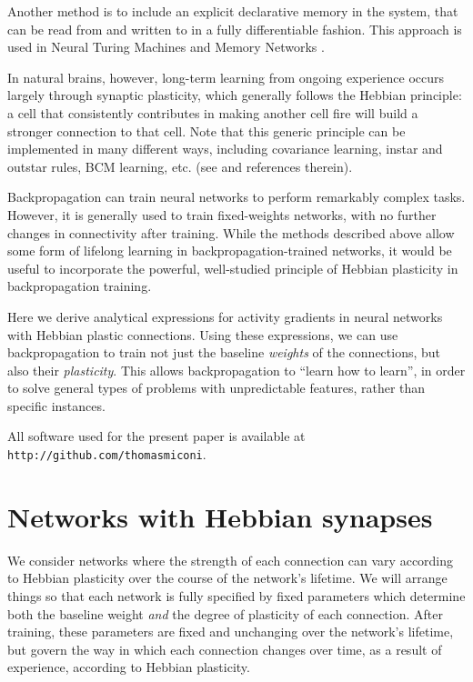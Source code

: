 \documentclass{article}
\begin{document}
Another method is to include an explicit declarative memory in the system, that can be read from and written to in a fully differentiable fashion. This 
approach is used in Neural Turing Machines
\cite{Graves2014-ch,Santoro2016-jn} and
Memory Networks \cite{Sukhbaatar2015-ly}. 


In natural brains, however, long-term learning from ongoing experience occurs
largely through synaptic plasticity, which generally follows the Hebbian principle: a
cell that consistently contributes in making another cell fire will build a
stronger connection to that cell. Note that this generic principle can be
implemented in many different ways, including covariance learning, instar and
outstar rules, BCM learning, etc. (see \cite{Vasilkoski2011-ww} and references therein). 

Backpropagation can train neural networks to perform remarkably complex
tasks. However, it is generally used to train fixed-weights networks, with no further changes in connectivity after training. While the methods described above allow some form of lifelong learning in backpropagation-trained networks, 
it would be useful to incorporate the powerful, well-studied
principle of Hebbian plasticity in backpropagation
training.

Here we derive analytical expressions for activity gradients in neural networks
with Hebbian plastic connections. Using these expressions, we can use
backpropagation to train not just the baseline \emph{weights} of the connections, but
also their \emph{plasticity}. This allows backpropagation to ``learn how to learn'',
in order to solve general types of problems with unpredictable features, rather
than specific instances.

All software used for the present paper is available at
\texttt{http://github.com/thomasmiconi}.

\section{Networks with Hebbian synapses}

We consider networks where the strength of each connection can vary according to
Hebbian plasticity over the course of the network's lifetime. We will arrange things so that each network is fully specified
by fixed parameters which determine both the baseline weight \emph{and} the degree of plasticity of each connection.
After training, these parameters are fixed and unchanging over the network's
lifetime, but govern the way in which
each connection changes over time, as a result of experience, according to Hebbian plasticity. 
\end{document}
